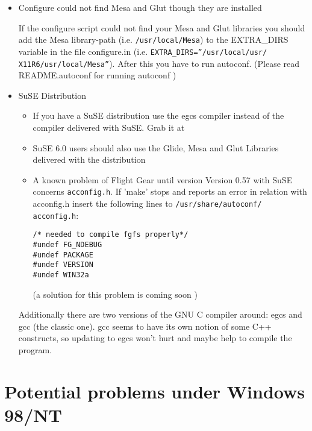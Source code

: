 \begin{itemize}
\item{Configure could not find Mesa and Glut though they are
installed}

If the configure script could not find your Mesa and Glut libraries you should add the
Mesa library-path (i.e. \texttt{/usr/local/Mesa}) to the EXTRA\_DIRS variable in the file
configure.in (i.e. \texttt{EXTRA\_DIRS=''/usr/local/usr/}
\texttt{X11R6/usr/local/Mesa''}). After this you have to run autoconf. (Please read
README.autoconf for running autoconf )

\item{SuSE Distribution}
\begin{itemize}
 \item If you have a SuSE distribution use the egcs compiler instead
of the compiler delivered with SuSE. Grab it at


 \item SuSE 6.0 users should also use the Glide,
Mesa and Glut Libraries delivered with the distribution
 \item A known problem of Flight Gear until version Version 0.57 with SuSE concerns
  \texttt{acconfig.h}. If 'make' stops and reports an error in relation with acconfig.h
insert the following lines to \texttt{/usr/share/autoconf/} \texttt{acconfig.h}:

        \texttt{/* needed to compile fgfs properly*/}\\
        \texttt{{\#}undef FG\_NDEBUG}\\
        \texttt{{\#}undef PACKAGE}\\
        \texttt{{\#}undef VERSION}\\
        \texttt{{\#}undef WIN32a}

(a solution for this problem is coming soon )
\end{itemize}

  Additionally there are two versions of the GNU C compiler around:
  egcs and gcc (the classic one). gcc seems to have its own notion of
  some C++ constructs, so updating to egcs won't hurt and maybe help
  to compile the program.

\end{itemize}

\section{Potential problems under Windows 98/NT}

